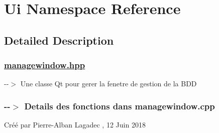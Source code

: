 \hypertarget{namespaceUi}{}\section{Ui Namespace Reference}
\label{namespaceUi}


\subsection{Detailed Description}
\subsubsection*{\mbox{\hyperlink{managewindow_8hpp_source}{managewindow.\+hpp}} }

-\/-\/$>$ Une classe Qt pour gerer la fenetre de gestion de la B\+DD

\subsubsection*{-\/-\/$>$ Details des fonctions dans managewindow.\+cpp }

Créé par Pierre-\/Alban Lagadec , 12 Juin 2018 